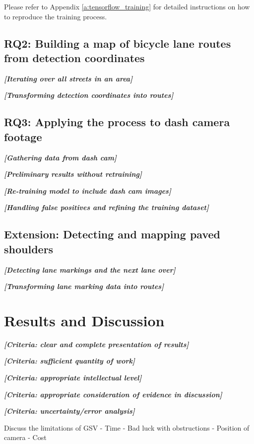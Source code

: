 \documentclass[11pt,twoside]{report}
\newcommand{\remark}[1]{{\bf \em [\marginpar{$\Leftarrow$}#1]}}
\begin{document}
Please refer to Appendix \ref{a:tensorflow_training} for detailed instructions on how to reproduce the training process.

\section{RQ2: Building a map of bicycle lane routes from detection coordinates}

\remark{Iterating over all streets in an area}

\remark{Transforming detection coordinates into routes}

\section{RQ3: Applying the process to dash camera footage}

\remark{Gathering data from dash cam}

\remark{Preliminary results without retraining}

\remark{Re-training model to include dash cam images}

\remark{Handling false positives and refining the training dataset}


\section{Extension: Detecting and mapping paved shoulders}

\remark{Detecting lane markings and the next lane over}

\remark{Transforming lane marking data into routes}


\chapter{Results and Discussion}

\remark{Criteria: clear and complete presentation of results}

\remark{Criteria: sufficient quantity of work}

\remark{Criteria: appropriate intellectual level}

\remark{Criteria: appropriate consideration of evidence in discussion}

\remark{Criteria: uncertainty/error analysis}

Discuss the limitations of GSV
- Time
- Bad luck with obstructions
- Position of camera
- Cost
\end{document}
